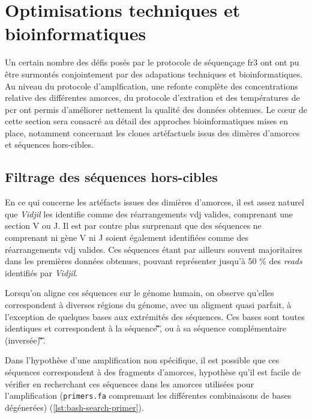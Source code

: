 \section{Optimisations techniques et bioinformatiques}

Un certain nombre des défis posés par le protocole de séquençage \gls{fr}3 ont ont pu être surmontés conjointement par 
des adapations techniques et bioinformatiques. Au niveau du protocole d'amplfication, une refonte complète des concentrations 
relative des différentes amorces, du protocole d'extration et des températures de \gls{pcr} ont permis d'améliorer nettement 
la qualité des données obtenues. Le cœur de cette section sera consacré au détail des approches bioinformatiques mises en place, 
notamment concernant les clones artéfactuels issus des dimères d'amorces et séquences hors-cibles.

\subsection{Filtrage des séquences hors-cibles}

En ce qui concerne les artéfacts issues des dimières d'amorces, il est assez naturel que \textit{Vidjil} les identifie comme 
des réarrangements \gls{vdj} valides, comprenant une section V ou J. Il est par contre plus surprenant que des séquences ne comprenant 
ni gène V ni J soient également identifiées comme des réarrangements \gls{vdj} valides. Ces séquences étant par ailleurs souvent majoritaires 
dans les premières données obtenues, pouvant représenter jusqu'à 50 \% des \textit{reads} identifiés par \textit{Vidjil}.

\vspace{1em}

Lorsqu'on aligne ces séquences sur le génome humain, on observe qu'elles correspondent à diverses régions du génome, avec un aligment quasi 
parfait, à l'exception de quelques bases aux extrémités des séquences. Ces bases sont toutes identiques et correspondent à la séquence 
\C\G\T\C\T\C\C\T\C\A\G\G\T\A\A\G, ou à sa séquence complémentaire (inversée) \C\T\T\A\C\C\T\G\A\G\G\A\G\A\C\G.

\vspace{1em}

Dans l'hypothèse d'une amplification non spécifique, il est possible que ces séquences correspondent à des fragments d'amorces,
hypothèse qu'il est facile de vérifier en recherchant ces séquences dans les amorces utilisées pour l'amplification (\texttt{primers.fa} 
compremant les différentes combinaisons de bases dégénerées)
(\autoref{lst:bash-search-primer}).

